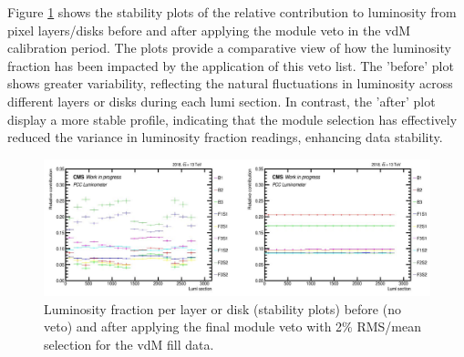 Figure \ref{fig:b_a_stability_vdm} shows the stability plots of the relative contribution to luminosity from pixel layers/disks before and after applying the module veto in the vdM calibration period. %
The plots provide a comparative view of how the luminosity fraction has been impacted by the application of this veto list. The 'before' plot shows greater variability, reflecting the natural fluctuations in luminosity across different layers or disks  during each lumi section. In contrast, the 'after' plot  display a more stable profile, indicating that the module selection has effectively reduced the variance in luminosity fraction readings, enhancing data stability. %

\begin{figure}[!htp]
\centering
\includegraphics[width=1\textwidth]{ashish_thesis/before_after_vdm_stability_1.png}
\caption[PCC vdM Stability]{%
   Luminosity fraction per layer or disk (stability plots) before (no veto) and after applying the final module veto with 2\% RMS/mean selection for the vdM fill data.
}
\label{fig:b_a_stability_vdm}
\end{figure}


